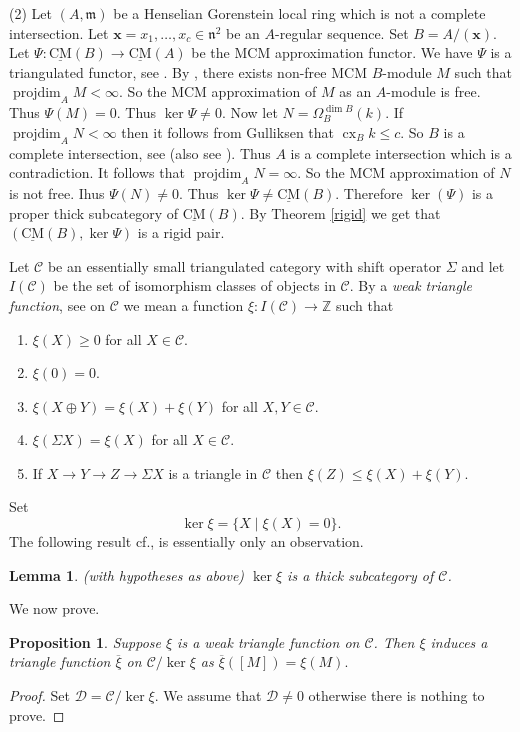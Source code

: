 \documentclass{amsart}
\newcommand{\D}{\mathcal{D} }
\newcommand{\bx}{\mathbf{x} }
\newcommand{\n}{\mathfrak{n} }
\newcommand{\m}{\mathfrak{m} }
\newcommand{\Z}{\mathbb{Z} }
\newcommand{\C}{\mathcal{C}}
\newcommand{\rt}{\rightarrow}
\newcommand{\ov}{\overline}
\newcommand{\cx}{\operatorname{cx}}
\newcommand{\CMS}{\operatorname{\underline{CM}}}
\newcommand{\projdim}{\operatorname{projdim}}
\theoremstyle{plain}
\newtheorem{lemma}[theorem]{Lemma}
\newtheorem{proposition}[theorem]{Proposition}
\theoremstyle{definition}
\theoremstyle{remark}
\begin{document}
{(2) Let $(A, \m)$ be a Henselian Gorenstein local ring which is not a complete intersection. Let
$\bx = x_1, \ldots, x_c \in \n^2$ be an $A$-regular sequence. Set $B = A/(\bx)$. Let $\Psi \colon \CMS(B) \rt \CMS(A)$ be the MCM approximation functor.
We have $\Psi$ is a triangulated functor, see \cite[p.\ 740]{BJM}. By \cite[3.1]{AGP},  there exists non-free  MCM $B$-module $M$  such that $\projdim_A M < \infty$. So the MCM approximation of $M$ as an $A$-module is free. Thus $\Psi(M) = 0$. Thus $\ker \Psi \neq 0$. Now let $N = \Omega^{\dim B}_B(k)$. If $\projdim_A  N < \infty$ then it follows from Gulliksen \cite[3.1]{G} that $\cx_B k \leq c$.   So $B$ is a complete intersection, see \cite{G-ci} (also see \cite[8.1.2]{A}). Thus $A$ is a complete intersection which is a contradiction. It follows that $\projdim_A  N = \infty$. So the MCM  approximation of $N$ is not free. Ihus $\Psi(N) \neq 0$. Thus $\ker \Psi \neq \CMS(B)$.
Therefore $\ker(\Psi)$ is a proper thick subcategory of $\CMS(B)$. By Theorem \ref{rigid} we get that $(\CMS(B), \ker\Psi)$ is a rigid pair.




\s \label{t-f} Let $\C$ be an essentially small triangulated category  with shift operator $\Sigma$ and let $I(\C)$ be the set of isomorphism classes of objects in $\C$. By a \emph{weak triangle function}, see \cite[2.1]{P-reg} on $\C$ we mean a function $\xi \colon I(\C) \rt \Z$ such that
\begin{enumerate}
  \item $\xi(X) \geq 0$ for all $X \in \C$.
  \item $\xi(0) = 0$.
  \item $\xi(X \oplus Y) = \xi(X) + \xi(Y)$ for all $X, Y \in \C$.
  \item $\xi(\Sigma X ) = \xi(X)$ for all $X \in \C$.
  \item If $X \rt Y \rt Z \rt \Sigma X $ is a triangle in $\C$ then
   $\xi(Z) \leq \xi(X) + \xi(Y)$.
\end{enumerate}
\s Set $$\ker \xi = \{ X \mid \xi(X) = 0 \}.$$
The following result cf., \cite[2.3]{P-reg} is essentially only an observation.
\begin{lemma}
\label{ker-lemma}(with hypotheses as above)
$\ker \xi $ is a thick subcategory of $\C$.
\end{lemma}
We now prove.
\begin{proposition}\label{pardesi}
Suppose $\xi$ is a weak triangle function on $\C$. Then $\xi$ induces a triangle function $\ov{\xi}$ on $\C/\ker \xi$ as $\ov{\xi}([M]) = \xi(M).$
\end{proposition}
\begin{proof}
  Set $\D = \C/\ker \xi$. We assume that $\D \neq 0$ otherwise there is nothing to prove.


\end{proof}}
\end{document}
